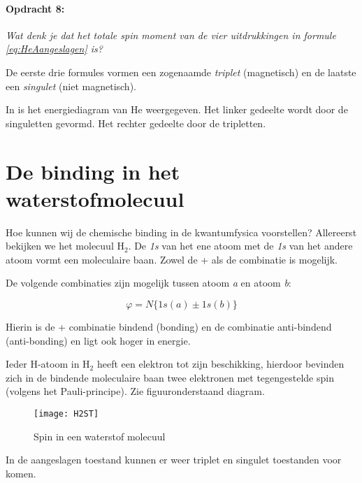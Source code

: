\paragraph*{Opdracht 8:}

\emph{Wat denk je dat het totale spin moment van de vier uitdrukkingen
in formule \ref{eq:HeAangeslagen} is?}

De eerste drie formules vormen een zogenaamde \emph{triplet} (magnetisch)
en de laatste een \emph{singulet} (niet magnetisch).

In  is het energiediagram van
He weergegeven. Het linker gedeelte wordt door de singuletten gevormd.
Het rechter gedeelte door de tripletten.


\section{De binding in het waterstofmolecuul}

Hoe kunnen wij de chemische binding in de kwantumfysica voorstellen?
Allereerst bekijken we het molecuul $\mathrm{H}_{2}$. De \emph{1s}
van het ene atoom met de \emph{1s} van het andere atoom vormt een
moleculaire baan. Zowel de + als de \textendash{} combinatie is mogelijk.

De volgende combinaties zijn mogelijk tussen atoom \emph{a} en atoom
\emph{b}:

\begin{equation}
\varphi=N\{1s(a)\pm1s(b)\}
\end{equation}


Hierin is de + combinatie bindend (bonding) en de \textendash{} combinatie
anti-bindend (anti-bonding) en ligt ook hoger in energie.

Ieder H-atoom in $\mathrm{H}_{2}$ heeft een elektron tot zijn beschikking,
hierdoor bevinden zich in de bindende moleculaire baan twee elektronen
met tegengestelde spin (volgens het Pauli-principe). Zie figuuronderstaand
diagram.

\begin{figure}[h]
\noindent \begin{centering}
\texttt{[image: H2ST]}
\par\end{centering}

\caption{Spin in een waterstof molecuul}
\end{figure}


In de aangeslagen toestand kunnen er weer triplet en singulet toestanden
voor komen.


